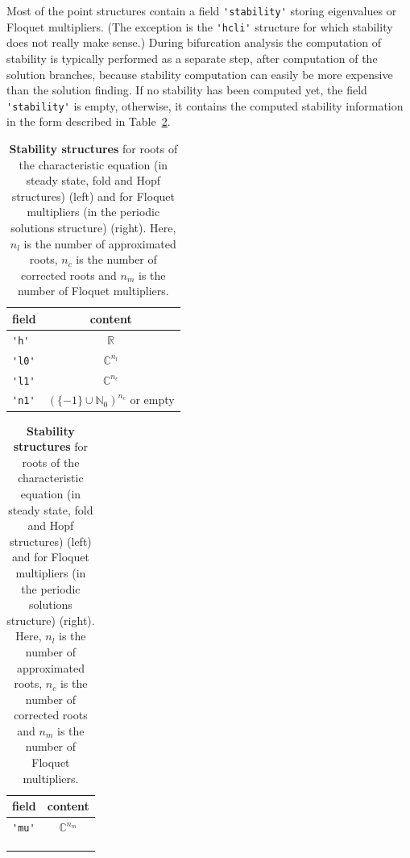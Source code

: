 \documentclass[10pt]{scrartcl}
\newcommand{\RR}{\mathbb{R}}
\newcommand{\NN}{\mathbb{N}}
\newcommand{\CC}{\mathbb{C}}
\newcommand{\blist}[1]{\mbox{\lstinline!#1!}}
\begin{document}
Most of the point structures contain a 
field \blist{'stability'} storing eigenvalues or Floquet multipliers. (The exception is  
the \blist{'hcli'} structure for which stability does not really make
sense.) During bifurcation analysis the computation of stability is
typically performed as a separate step, after computation of the
solution branches, because stability computation can easily be more
expensive than the solution finding. If no stability has been computed
yet, the field \blist{'stability'} is empty, otherwise, it contains
the computed stability information in the form described in
Table~\ref{stab_structures}.

\begin{table}[htbp]
  \begin{center}
    \begin{subtable}[t]{0.45\textwidth}
      \begin{tabular}[t]{lc}\hline\noalign{\smallskip}
        field & content     \\\hline\noalign{\smallskip}
        \blist{'h'}     & $\RR$       \\
        \blist{'l0'}    & $\CC^{n_l}$ \\
        \blist{'l1'}    & $\CC^{n_c}$ \\
        \blist{'n1'}    & $(\{-1\}\cup\NN_0)^{n_c}$ or empty\\\hline
      \end{tabular}
      \caption{Structure in field \blist{'stability'} for steady
        state, fold and Hopf points of Table~\ref{point_structures}}
    \end{subtable}\qquad
    \begin{subtable}[t]{0.45\textwidth}
      \begin{tabular}[t]{lc}\hline\noalign{\smallskip}
        field & content     \\\hline\noalign{\smallskip}
        \blist{'mu'}    & $\CC^{n_m}$ \\ \\ \\ \\\hline
      \end{tabular}
      \caption{Structure in field \blist{'stability'} for periodic
        orbit points of Table~\ref{point_structures}}
    \end{subtable}
  \end{center}
  \caption{\label{stab_structures}
    \textbf{\textsf{Stability structures}} for roots of the characteristic equation
    (in steady state, fold and Hopf structures) (left)
    and for Floquet multipliers (in the periodic solutions structure) (right). 
    Here, $n_l$ is the number of approximated roots,
    $n_c$ is the number of corrected roots and $n_m$ is the number
    of Floquet multipliers.}
\end{table}
\end{document}
